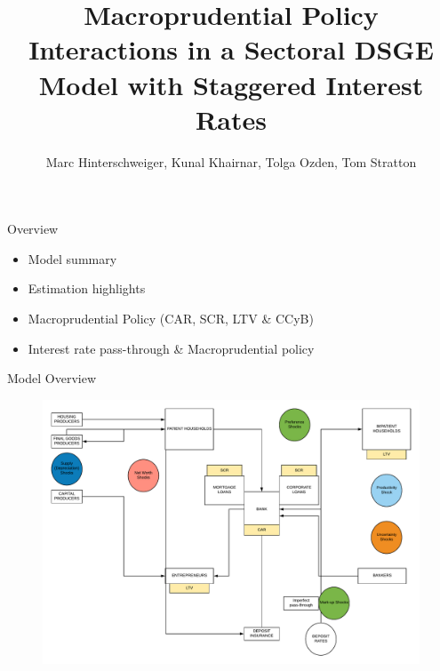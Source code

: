 \documentclass[8pt,aspectratio=169]{beamer}
\title{\bf Macroprudential Policy Interactions in a Sectoral DSGE Model with Staggered Interest Rates}
\author{Marc Hinterschweiger, Kunal Khairnar, Tolga Ozden, Tom Stratton}
\numberwithin{equation}{section}
\begin{document}
\titlepage
\begin{frame}{Overview}




\begin{itemize}

\item Model summary
\vspace{5 mm}
\item Estimation highlights
\vspace{5 mm}
\item Macroprudential Policy (CAR, SCR, LTV \& CCyB)
\vspace{5 mm}
\item Interest rate pass-through \& Macroprudential policy
\end{itemize}


\end{frame}





\begin{frame}{Model Overview}

\begin{figure}
\includegraphics[scale=0.45]{3d_flowchart_full.pdf}
\end{figure}

\end{frame}
\end{document}
